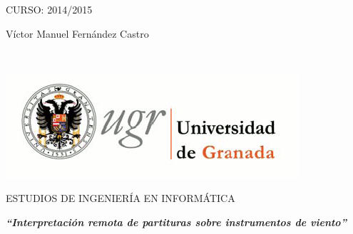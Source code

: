 \begin{center}
\vspace*{3cm} 
\par\end{center}

\begin{center}
{\large CURSO: 2014/2015}
\par\end{center}{\large \par}

\begin{center}
{\large Víctor Manuel Fernández Castro}
\par\end{center}{\large \par}

\newpage
\thispagestyle{empty}

~

\newpage
\thispagestyle{empty}

\begin{center}
\includegraphics[scale=0.8]{logo_ugr.png}
\par\end{center}

\begin{center}
ESTUDIOS DE INGENIERÍA EN INFORMÁTICA
\par\end{center}

\begin{center}
\vspace*{0.1cm}
\par\end{center}

\begin{center}
\textbf{\emph{\Large {}``Interpretación remota de partituras sobre instrumentos de viento''}}
\par\end{center}{\Large \par}

\begin{center}
\vspace*{0.3cm}
\par\end{center}

